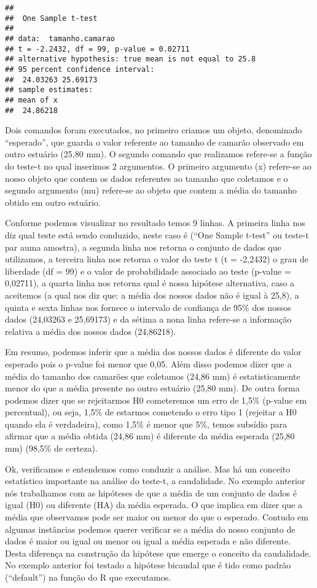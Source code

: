 \documentclass[titlepage, oneside, openany, a4paper]{book}
\begin{document}
\begin{verbatim}
## 
##  One Sample t-test
## 
## data:  tamanho.camarao
## t = -2.2432, df = 99, p-value = 0.02711
## alternative hypothesis: true mean is not equal to 25.8
## 95 percent confidence interval:
##  24.03263 25.69173
## sample estimates:
## mean of x 
##  24.86218
\end{verbatim}

Dois comandos foram executados, no primeiro criamos um objeto, denominado ``esperado'', que guarda o valor referente ao tamanho de camarão observado em outro estuário (25,80 mm). O segundo comando que realizamos refere-se a função do teste-t no qual inserimos 2 argumentos. O primeiro argumento (x) refere-se ao nosso objeto que contem os dados referentes ao tamanho que coletamos e o segundo argumento (mu) refere-se ao objeto que contem a média do tamanho obtido em outro estuário.

Conforme podemos visualizar no resultado temos 9 linhas. A primeira linha nos diz qual teste está sendo conduzido, neste caso é (``One Sample t-test'' ou teste-t par auma amostra), a segunda linha nos retorna o conjunto de dados que utilizamos, a terceira linha nos retorna o valor do teste t (t = -2,2432) o grau de liberdade (df = 99) e o valor de probabilidade associado ao teste (p-value = 0,02711), a quarta linha nos retorna qual é nossa hipótese alternativa, caso a aceitemos (a qual nos diz que: a média dos nossos dados não é igual à 25,8), a quinta e sexta linhas nos fornece o intervalo de confiança de 95\% dos nossos dados (24,03263 e 25,69173) e da sétima a nona linha refere-se a informação relativa a média dos nossos dados (24,86218).

Em resumo, podemos inferir que a média dos nossos dados é diferente do valor esperado pois o p-value foi menor que 0,05. Além disso podemos dizer que a média do tamanho dos camarões que coletamos (24,86 mm) é estatisticamente menor do que a média presente no outro estuário (25,80 mm). De outra forma podemos dizer que se rejeitarmos H0 cometeremos um erro de 1,5\% (p-value em percentual), ou seja, 1,5\% de estarmos cometendo o erro tipo 1 (rejeitar a H0 quando ela é verdadeira), como 1,5\% é menor que 5\%, temos subsídio para afirmar que a média obtida (24,86 mm) é diferente da média esperada (25,80 mm) (98,5\% de certeza).

Ok, verificamos e entendemos como conduzir a análise. Mas há um conceito estatístico importante na análise do teste-t, a caudalidade. No exemplo anterior nós trabalhamos com as hipóteses de que a média de um conjunto de dados é igual (H0) ou diferente (HA) da média esperada. O que implica em dizer que a média que observamos pode ser maior ou menor do que o esperado. Contudo em algumas instâncias podemos querer verificar se a média do nosso conjunto de dados é maior ou igual ou menor ou igual a média esperada e não diferente. Desta diferença na construção da hipótese que emerge o conceito da caudalidade. No exemplo anterior foi testado a hipótese bicaudal que é tido como padrão (``default'') na função do R que executamos.
\end{document}
